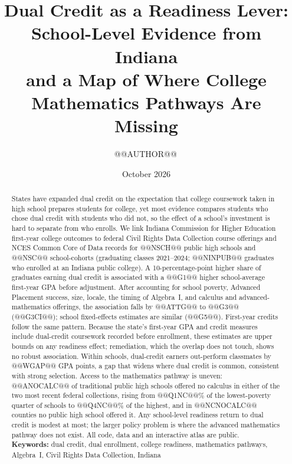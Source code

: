 \documentclass[aps,prd,reprint,superscriptaddress,nofootinbib,floatfix]{revtex4-2}
\begin{document}
\raggedbottom

\title{Dual Credit as a Readiness Lever: School-Level Evidence from Indiana\\and a Map of Where College Mathematics Pathways Are Missing}

\author{@@AUTHOR@@\,}

\date{October 2026}

\begin{abstract}
States have expanded dual credit on the expectation that college coursework taken in high school prepares students for college, yet most evidence compares students who chose dual credit with students who did not, so the effect of a school's investment is hard to separate from who enrolls. We link Indiana Commission for Higher Education first-year college outcomes to federal Civil Rights Data Collection course offerings and NCES Common Core of Data records for @@NSCH@@ public high schools and @@NSC@@ school-cohorts (graduating classes 2021--2024; @@NINPUB@@ graduates who enrolled at an Indiana public college). A 10-percentage-point higher share of graduates earning dual credit is associated with a @@G1@@ higher school-average first-year GPA before adjustment. After accounting for school poverty, Advanced Placement success, size, locale, the timing of Algebra~I, and calculus and advanced-mathematics offerings, the association falls by @@ATTG@@ to @@G3@@ (@@G3CI@@); school fixed-effects estimates are similar (@@G5@@). First-year credits follow the same pattern. Because the state's first-year GPA and credit measures include dual-credit coursework recorded before enrollment, these estimates are upper bounds on any readiness effect; remediation, which the overlap does not touch, shows no robust association. Within schools, dual-credit earners out-perform classmates by @@WGAP@@ GPA points, a gap that widens where dual credit is common, consistent with strong selection. Access to the mathematics pathway is uneven: @@ANOCALC@@ of traditional public high schools offered no calculus in either of the two most recent federal collections, rising from @@Q1NC@@\% of the lowest-poverty quarter of schools to @@Q4NC@@\% of the highest, and in @@NCNOCALC@@ counties no public high school offered it. Any school-level readiness return to dual credit is modest at most; the larger policy problem is where the advanced mathematics pathway does not exist. All code, data and an interactive atlas are public.\\[4pt]
\textbf{Keywords:} dual credit, dual enrollment, college readiness, mathematics pathways, Algebra~I, Civil Rights Data Collection, Indiana
\end{abstract}
\end{document}
